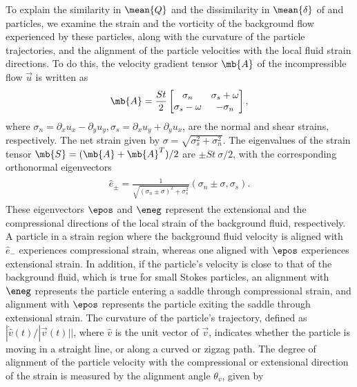 To explain the similarity in $\mean{Q}$ and the dissimilarity in $\mean{\delta}$ of \cs and \su particles, we examine the strain and the vorticity of the background flow experienced by these particles, along with the curvature of the particle trajectories, and the alignment of the particle velocities with the local fluid strain directions. To do this, the velocity gradient tensor $\mb{A}$ of the incompressible flow $\vec{u}$ is written as 
\begin{align}
\begin{split}
    \mb{A} = \frac{St}{2}
    \begin{bmatrix}
      \sigma_n & \sigma_s + \omega \\
      \sigma_s - \omega & -\sigma_n
    \end{bmatrix}, 
\end{split}
\end{align}
where $\sigma_n = \partial_x u_x - \partial_y u_y, \sigma_s = \partial_x u_y + \partial_y u_x$, are the  normal and shear strains, respectively. The net strain given by $\sigma = \sqrt{\sigma_s^2 + \sigma_n^2}$. The eigenvalues of the strain tensor $\mb{S} = (\mb{A} + \mb{A}^T)/ 2$ are $\pm St~\sigma/2$, with the corresponding orthonormal eigenvectors 
\begin{align}
\label{epm}
\begin{split}
    \hat{e}_\pm = \frac{1}{\sqrt{(\sigma_n \pm \sigma)^2 + \sigma_s^2}}\left(\sigma_n \pm \sigma, \sigma_s\right).
\end{split}
\end{align} 
These eigenvectors $\epos$ and $\eneg$ represent the extensional and the compressional directions of the local strain of the background fluid, respectively. A particle in a strain region where the background fluid velocity is aligned with $\hat e_-$ experiences  compressional strain, whereas one aligned with $\epos$ experiences extensional strain. In addition, if the particle's velocity is close to that of the background fluid, which is true for small Stokes particles, an alignment with $\eneg$ represents the particle entering a saddle through compressional strain, and alignment with $\epos$ represents the particle exiting the saddle through extensional strain. The curvature of the particle's trajectory, defined as $|\dot{\hat{v}}(t)/|\vec{v}(t)||$, where $\hat{v}$ is the unit vector of $\vec{v}$, indicates whether the particle is moving in a straight line, or along a curved or zigzag path. The degree of alignment of the particle velocity with the compressional or extensional direction of the strain is measured by the alignment angle $\theta_v$, given by 
